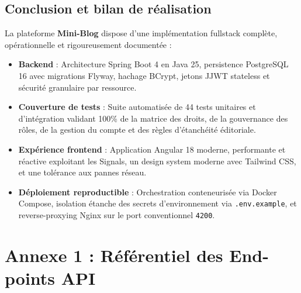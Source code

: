 \documentclass[11pt,a4paper]{article}
\begin{document}
\subsection{Conclusion et bilan de réalisation}

La plateforme \textbf{Mini-Blog} dispose d'une implémentation fullstack complète, opérationnelle et rigoureusement documentée :
\begin{itemize}
    \item \textbf{Backend} : Architecture Spring Boot 4 en Java 25, persistence PostgreSQL 16 avec migrations Flyway, hachage BCrypt, jetons JJWT stateless et sécurité granulaire par ressource.
    \item \textbf{Couverture de tests} : Suite automatisée de 44 tests unitaires et d'intégration validant 100\% de la matrice des droits, de la gouvernance des rôles, de la gestion du compte et des règles d'étanchéité éditoriale.
    \item \textbf{Expérience frontend} : Application Angular 18 moderne, performante et réactive exploitant les Signals, un design system moderne avec Tailwind CSS, et une tolérance aux pannes réseau.
    \item \textbf{Déploiement reproductible} : Orchestration conteneurisée via Docker Compose, isolation étanche des secrets d'environnement via \texttt{.env.example}, et reverse-proxying Nginx sur le port conventionnel \texttt{4200}.
\end{itemize}

\newpage
\appendix
\section{Annexe 1 : Référentiel des End-points API}
\end{document}
